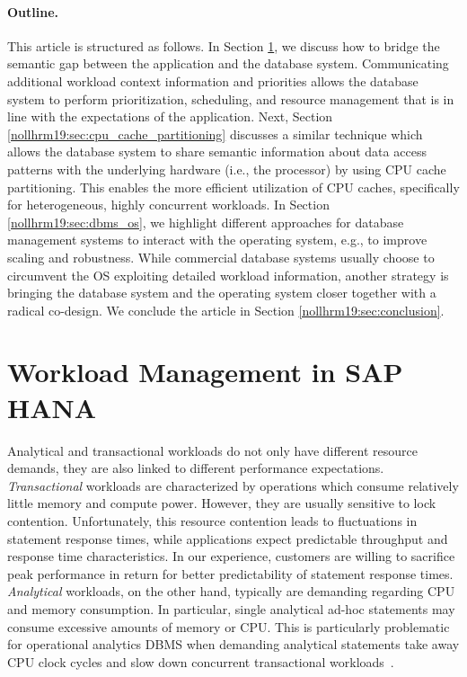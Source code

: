 \documentclass[11pt,dvipdfm]{article}
\begin{document}
\paragraph{Outline.}
This article is structured as follows.
In Section \ref{nollhrm19:sec:hana_wlm}, we discuss how to bridge the semantic gap between the application and the database system.
Communicating additional workload context information and priorities allows the database system to perform prioritization, scheduling, and resource management that is in line with the expectations of the application.
Next, Section \ref{nollhrm19:sec:cpu_cache_partitioning} discusses a similar technique which allows the database system to share semantic information about data access patterns with the underlying hardware (i.e., the processor) by using CPU cache partitioning.
This enables the more efficient utilization of CPU caches, specifically for heterogeneous, highly concurrent workloads.
In Section \ref{nollhrm19:sec:dbms_os}, we highlight different approaches for database management systems to interact with the operating system, e.g., to improve scaling and robustness.
While commercial database systems usually choose to circumvent the OS exploiting detailed workload information, another strategy is bringing the database system and the operating system closer together with a radical co-design.
We conclude the article in Section \ref{nollhrm19:sec:conclusion}.



\section{Workload Management in SAP HANA}
\label{nollhrm19:sec:hana_wlm}

Analytical and transactional workloads do not only have different resource demands, they are also linked to different performance expectations.
\emph{Transactional} workloads are characterized by operations which consume relatively little memory and compute power.
However, they are usually sensitive to lock contention.
Unfortunately, this resource contention leads to fluctuations in statement response times, while applications expect predictable throughput and response time characteristics.
In our experience, customers are willing to sacrifice peak performance in return for better predictability of statement response times.
\emph{Analytical} workloads, on the other hand, typically are demanding regarding CPU and memory consumption.
In particular, single analytical ad-hoc statements may consume excessive amounts of memory or CPU.
This is particularly problematic for operational analytics DBMS when demanding analytical statements take away CPU clock cycles and slow down concurrent transactional workloads~\cite{nollhrm19:Wolf:2014:SUM}.
\end{document}
